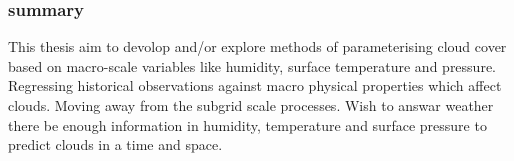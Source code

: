 

\subsubsection{summary}
This thesis aim to devolop and/or explore methods of parameterising cloud cover based on macro-scale variables like humidity, surface temperature and pressure. Regressing historical observations against macro physical properties which affect clouds. Moving away from the subgrid scale processes. Wish to answar weather there be enough information in humidity, temperature and surface pressure to predict clouds in a time and space.




